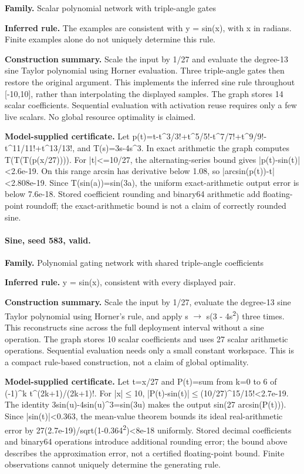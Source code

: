 \textbf{Family.} Scalar polynomial network with triple-angle gates


\textbf{Inferred rule.} The examples are consistent with y = sin(x), with x in radians. Finite examples alone do not uniquely determine this rule.


\textbf{Construction summary.} Scale the input by 1/27 and evaluate the degree-13 sine Taylor polynomial using Horner evaluation. Three triple-angle gates then restore the original argument. This implements the inferred sine rule throughout [-10,10], rather than interpolating the displayed samples. The graph stores 14 scalar coefficients. Sequential evaluation with activation reuse requires only a few live scalars. No global resource optimality is claimed.


\textbf{Model-supplied certificate.} Let p(t)=t-t\textasciicircum{}3/3!+t\textasciicircum{}5/5!-t\textasciicircum{}7/7!+t\textasciicircum{}9/9!-t\textasciicircum{}11/11!+t\textasciicircum{}13/13!, and T(s)=3s-4s\textasciicircum{}3. In exact arithmetic the graph computes T(T(T(p(x/27)))). For |t|<=10/27, the alternating-series bound gives |p(t)-sin(t)|<2.6e-19. On this range arcsin has derivative below 1.08, so |arcsin(p(t))-t|<2.808e-19. Since T(sin(a))=sin(3a), the uniform exact-arithmetic output error is below 7.6e-18. Stored coefficient rounding and binary64 arithmetic add floating-point roundoff; the exact-arithmetic bound is not a claim of correctly rounded sine.


\paragraph{Sine, seed 583, valid.}

\textbf{Family.} Polynomial gating network with shared triple-angle coefficients


\textbf{Inferred rule.} y = sin(x), consistent with every displayed pair.


\textbf{Construction summary.} Scale the input by 1/27, evaluate the degree-13 sine Taylor polynomial using Horner's rule, and apply s \ensuremath{\to} s(3 - 4s\textsuperscript{2}) three times. This reconstructs sine across the full deployment interval without a sine operation. The graph stores 10 scalar coefficients and uses 27 scalar arithmetic operations. Sequential evaluation needs only a small constant workspace. This is a compact rule-based construction, not a claim of global optimality.


\textbf{Model-supplied certificate.} Let t=x/27 and P(t)=sum from k=0 to 6 of (-1)\textasciicircum{}k t\textasciicircum{}(2k+1)/(2k+1)!. For |x|\ensuremath{\leq}10, |P(t)-sin(t)|\ensuremath{\leq}(10/27)\textasciicircum{}15/15!<2.7e-19. The identity 3sin(u)-4sin(u)\textasciicircum{}3=sin(3u) makes the output sin(27 arcsin(P(t))). Since |sin(t)|<0.363, the mean-value theorem bounds its ideal real-arithmetic error by 27(2.7e-19)/sqrt(1-0.364\textsuperscript{2})<8e-18 uniformly. Stored decimal coefficients and binary64 operations introduce additional rounding error; the bound above describes the approximation error, not a certified floating-point bound. Finite observations cannot uniquely determine the generating rule.


